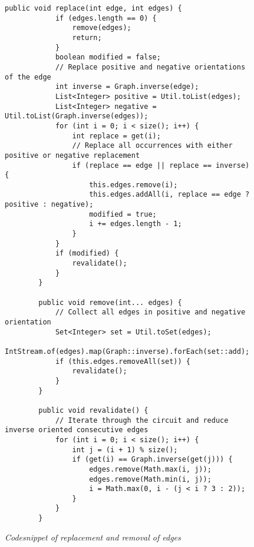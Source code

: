 \lstset{language=Java}
\begin{figure}
    \begin{lstlisting}[frame=single]
        public void replace(int edge, int edges) {
            if (edges.length == 0) {
                remove(edges);
                return;
            }
            boolean modified = false;
            // Replace positive and negative orientations of the edge
            int inverse = Graph.inverse(edge);
            List<Integer> positive = Util.toList(edges);
            List<Integer> negative = Util.toList(Graph.inverse(edges));
            for (int i = 0; i < size(); i++) {
                int replace = get(i);
                // Replace all occurrences with either positive or negative replacement
                if (replace == edge || replace == inverse) {
                    this.edges.remove(i);
                    this.edges.addAll(i, replace == edge ? positive : negative);
                    modified = true;
                    i += edges.length - 1;
                }
            }
            if (modified) {
                revalidate();
            }
        }

        public void remove(int... edges) {
            // Collect all edges in positive and negative orientation
            Set<Integer> set = Util.toSet(edges);
            IntStream.of(edges).map(Graph::inverse).forEach(set::add);
            if (this.edges.removeAll(set)) {
                revalidate();
            }
        }

        public void revalidate() {
            // Iterate through the circuit and reduce inverse oriented consecutive edges
            for (int i = 0; i < size(); i++) {
                int j = (i + 1) % size();
                if (get(i) == Graph.inverse(get(j))) {
                    edges.remove(Math.max(i, j));
                    edges.remove(Math.min(i, j));
                    i = Math.max(0, i - (j < i ? 3 : 2));
                }
            }
        }
    \end{lstlisting}
    \caption{\textit{Codesnippet of replacement and removal of edges}}
    \label{fig5}
\end{figure}